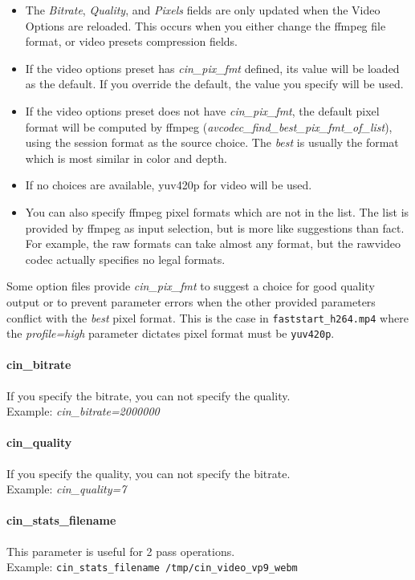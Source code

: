 \begin{itemize}
    \item The \textit{Bitrate}, \textit{Quality}, and \textit{Pixels} fields are only updated when the Video Options are reloaded.  This
    occurs when you either change the ffmpeg file format, or video presets compression fields.
    \item If the video options preset has \textit{cin\_pix\_fmt} defined, its value will be loaded as the default.  If you
    override the default, the value you specify will be used.
    \item If the video options preset does not have \textit{cin\_pix\_fmt}, the default pixel format will be computed by ffmpeg (\textit{avcodec\_find\_best\_pix\_fmt\_of\_list}), using the session format as the source choice.  The
    \textit{best} is usually the format which is most similar in color and depth.
    \item If no choices are available, yuv420p for video will be used.
    \item You can also specify ffmpeg pixel formats which are not in the list.  The list is provided by ffmpeg as input selection, but is more like suggestions than fact.  For example, the raw formats can take almost any format, but the rawvideo codec actually specifies no legal formats.
\end{itemize}

\noindent Some option files provide \textit{cin\_pix\_fmt} to suggest a choice for good quality output or to prevent parameter errors when the other provided parameters conflict with the \textit{best} pixel format.  This is the case in \texttt{faststart\_h264.mp4} where the \textit{profile=high} parameter dictates pixel format must be \texttt{yuv420p}.

\paragraph{cin\_bitrate} If you specify the bitrate, you can not specify the quality.\\
Example: \textit{cin\_bitrate=2000000}

\paragraph{cin\_quality} If you specify the quality, you can not specify the bitrate.\\
Example: \textit{cin\_quality=7}

\paragraph{cin\_stats\_filename} This parameter is useful for 2 pass operations.\\
Example: \texttt{cin\_stats\_filename /tmp/cin\_video\_vp9\_webm}

